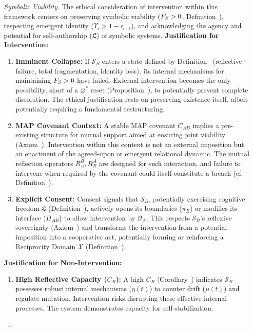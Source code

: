 \begin{proof}[Symbolic Viability]
\label{proof:bk9_symbolic_viability}
The ethical consideration of intervention within this framework centers on preserving symbolic viability ($F_S > 0$, Definition~), respecting emergent identity ($\Upsilon_i > 1-\epsilon_{\text{crit}}$), and acknowledging the agency and potential for self-authorship ($\mathfrak{L}$) of symbolic systems.
\textbf{Justification for Intervention:}
\begin{enumerate}
    \item \textbf{Imminent Collapse:} If $\mathcal{S}_B$ enters a state defined by Definition~ (reflective failure, total fragmentation, identity loss), its internal mechanisms for maintaining $F_S > 0$ have failed. External intervention becomes the only possibility, short of a $\varnothing^*$ reset (Proposition~), to potentially prevent complete dissolution. The ethical justification rests on preserving existence itself, albeit potentially requiring a fundamental restructuring.
    \item \textbf{MAP Covenant Context:} A stable MAP covenant $C_{AB}$ implies a pre-existing structure for mutual support aimed at ensuring joint viability (Axiom~). Intervention within this context is not an external imposition but an enactment of the agreed-upon or emergent relational dynamic. The mutual reflection operators $R^B_A, R^A_B$ are designed for such interaction, and failure to intervene when required by the covenant could itself constitute a breach (cf. Definition~).
    \item \textbf{Explicit Consent:} Consent signals that $\mathcal{S}_B$, potentially exercising cognitive freedom $\mathfrak{L}$ (Definition~), actively opens its boundaries ($\pi_B$) or modifies its interface ($\Pi_{AB}$) to allow intervention by $\mathcal{O}_A$. This respects $\mathcal{S}_B$'s reflexive sovereignty (Axiom~) and transforms the intervention from a potential imposition into a cooperative act, potentially forming or reinforcing a Reciprocity Domain $\mathcal{X}$ (Definition~).
\end{enumerate}
\textbf{Justification for Non-Intervention:}
\begin{enumerate}
    \item \textbf{High Reflective Capacity ($C_R$):} A high $C_R$ (Corollary~) indicates $\mathcal{S}_B$ possesses robust internal mechanisms ($\eta(t)$) to counter drift ($\mu(t)$) and regulate mutation. Intervention risks disrupting these effective internal processes. The system demonstrates capacity for self-stabilization.

\end{enumerate}
\end{proof}
